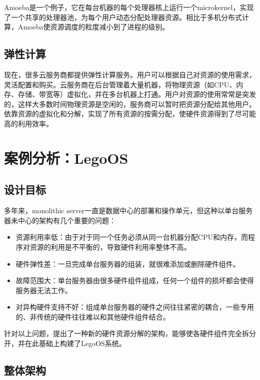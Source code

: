 Amoeba\parencite{tanenbaum1991amoeba}是一个例子，它在每台机器的每个处理器核上运行一个microkernel，实现了一个共享的处理器池，为每个用户动态分配处理器资源。相比于多机分布式计算，Amoeba使资源调度的粒度减小到了进程的级别。

\subsection{弹性计算}

现在，很多云服务商都提供弹性计算服务。用户可以根据自己对资源的使用需求，灵活配置和购买。云服务商在后台管理着大量机器，将物理资源（如CPU、内存、存储、带宽等）虚拟化，并在多台机器上打通。用户对资源的使用常常是突发的，这样大多数时间物理资源是空闲的，服务商可以暂时把资源分配给其他用户。依靠资源的虚拟化和分解，实现了所有资源的按需分配，使硬件资源得到了尽可能高的利用效率。


\section{案例分析：LegoOS}

\subsection{设计目标}

多年来，monolithic server一直是数据中心的部署和操作单元，但这种以单台服务器未中心的架构有几个重要的问题：
\begin{itemize}
\item 资源利用率低：由于对于同一个任务必须从同一台机器分配CPU和内存，而程序对资源的利用是不平衡的，导致硬件利用率整体不高。
\item 硬件弹性差：一旦完成单台服务器的组装，就很难添加或删除硬件组件。
\item 故障范围大：单台服务器由很多硬件组件组成，任何一个组件的损坏都会使得服务器无法工作。
\item 对异构硬件支持不好：组成单台服务器的硬件之间往往紧密的耦合，一些专用的、非传统的硬件往往难以和其他硬件组件结合。
\end{itemize}

针对以上问题，提出了一种新的硬件资源分解的架构，能够使各硬件组件完全拆分开，并在此基础上构建了LegoOS系统。

\subsection{整体架构}

